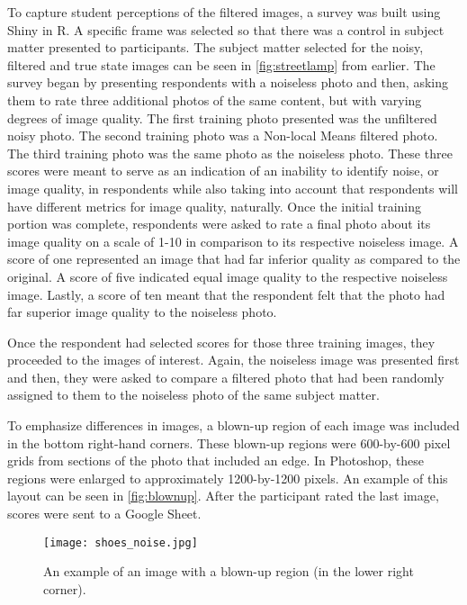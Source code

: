 \documentclass{ncjms}
\begin{document}
To capture student perceptions of the filtered images, a survey was built using Shiny \citep{shiny} in R. A specific frame was selected so that there was a control in subject matter presented to participants. The subject matter selected for the noisy, filtered and true state images can be seen in \autoref{fig:streetlamp} from earlier. The survey began by presenting respondents with a noiseless photo and then, asking them to rate three additional photos of the same content, but with varying degrees of image quality. The first training photo presented was the unfiltered noisy photo. The second training photo was a Non-local Means filtered photo. The third training photo was the same photo as the noiseless photo. These three scores were meant to serve as an indication of an inability to identify noise, or image quality, in respondents while also taking into account that respondents will have different metrics for image quality, naturally. Once the initial training portion was complete, respondents were asked to rate a final photo about its image quality on a scale of 1-10 in comparison to its respective noiseless image. A score of one represented an image that had far inferior quality as compared to the original. A score of five indicated equal image quality to the respective noiseless image. Lastly, a score of ten meant that the respondent felt that the photo had far superior image quality to the noiseless photo.

Once the respondent had selected scores for those three training images, they proceeded to the images of interest. Again, the noiseless image was presented first and then, they were asked to compare a filtered photo that had been randomly assigned to them to the noiseless photo of the same subject matter. 

To emphasize differences in images, a blown-up region of each image was included in the bottom right-hand corners. These blown-up regions were 600-by-600 pixel grids from sections of the photo that included an edge. In Photoshop, these regions were enlarged to approximately 1200-by-1200 pixels. An example of this layout can be seen in \autoref{fig:blownup}. After the participant rated the last image, scores were sent to a Google Sheet.

\begin{figure}
  \texttt{[image: shoes\_noise.jpg]}
  \caption{An example of an image with a blown-up region (in the lower right corner).}
  \label{fig:blownup}
\end{figure}
\end{document}
